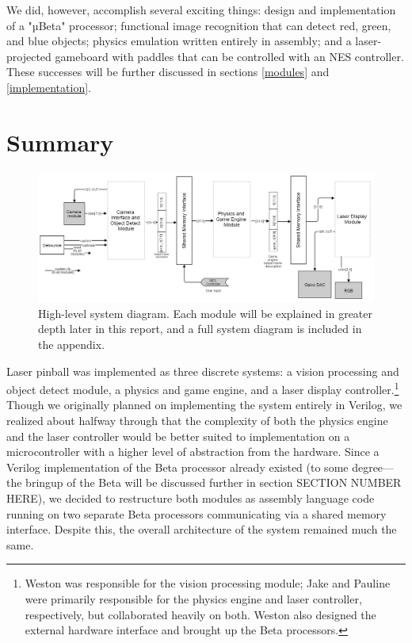 \documentclass{article}
\begin{document}
We did, however, accomplish several exciting things: design and implementation of a "µBeta" processor; functional image recognition that can detect red, green, and blue objects; physics emulation written entirely in assembly; and a laser-projected gameboard with paddles that can be controlled with an NES controller.  These successes will be further discussed in sections \ref{modules} and \ref{implementation}.


\section{Summary} \label{summary}

\begin{figure}[H]
\begin{center}
\includegraphics[width=\textwidth]{high_level_diagram} 
\caption{High-level system diagram. Each module will be explained in greater depth later in this report, and a full system diagram is included in the appendix.}
\end{center}
\end{figure}

Laser pinball was implemented as three discrete systems: a vision processing and object detect module, a physics and game engine, and a laser display controller.\footnote{Weston was responsible for the vision processing module; Jake and Pauline were primarily responsible for the physics engine and laser controller, respectively, but collaborated heavily on both. Weston also designed the external hardware interface and brought up the Beta processors.}  Though we originally planned on implementing the system entirely in Verilog, we realized about halfway through that the complexity of both the physics engine and the laser controller would be better suited to implementation on a microcontroller with a higher level of abstraction from the hardware. Since a Verilog implementation of the Beta processor already existed (to some degree—the bringup of the Beta will be discussed further in section SECTION NUMBER HERE), we decided to restructure both modules as assembly language code running on two separate Beta processors communicating via a shared memory interface. Despite this, the overall architecture of the system remained much the same.
\end{document}
